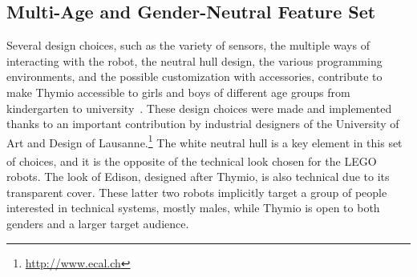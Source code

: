 \documentclass[letterpaper, 10 pt, conference]{ieeeconf}  %
\begin{document}

\subsection{Multi-Age and Gender-Neutral Feature Set}
\label{sec:multi}

Several design choices, such as the variety of sensors, the multiple ways of interacting with the robot, the neutral hull design, the various programming environments, and the possible customization with accessories, contribute to make Thymio accessible to girls and boys of different age groups from kindergarten to university~\cite{Riedo2013}.
These design choices were made and implemented thanks to an important contribution by industrial designers of the University of Art and Design of Lausanne.\footnote{\url{http://www.ecal.ch}}
The white neutral hull is a key element in this set of choices, and it is the opposite of the technical look chosen for the LEGO\textsuperscript{\textregistered} robots. The look of Edison, designed after Thymio, is also technical due to its transparent cover. 
These latter two robots implicitly target a group of people interested in technical systems, mostly males, while Thymio is open to both genders and a larger target audience.
\end{document}
